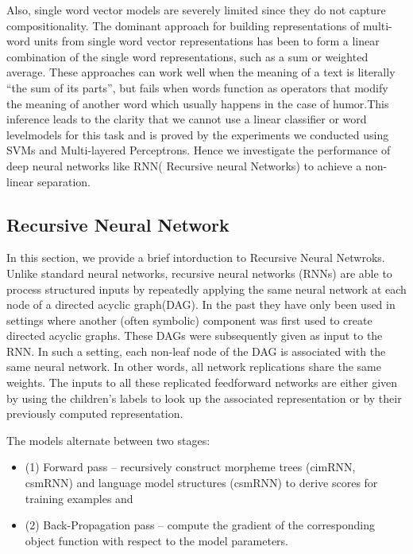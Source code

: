 \documentclass{acm_proc_article-sp}
\begin{document}
Also, single word vector models are severely limited since they do not capture compositionality. The dominant approach for building representations  of multi-word units from single word vector representations has been to form a linear combination of the single word representations, such as a sum or weighted average.  These approaches can work well when the meaning of a text is literally “the sum of its parts”, but fails when words function as operators that modify the meaning of another word which usually happens in the case of humor.This inference leads to the clarity that we cannot use a linear classifier or word  levelmodels for this task and is proved by the experiments we conducted using SVMs and Multi-layered Perceptrons. Hence we investigate the performance of deep neural networks like RNN( Recursive neural Networks) to achieve a non-linear separation.

\subsection{Recursive Neural Network}

In this section, we provide a brief intorduction to Recursive Neural Netwroks. Unlike standard neural networks, recursive neural networks (RNNs) are able to process structured inputs by repeatedly applying the same neural network at each node of a directed acyclic graph(DAG). In the past they have only been used in settings where another (often symbolic) component was first used to create directed acyclic graphs. These DAGs were subsequently given as input to the RNN. In such a setting, each non-leaf node of the DAG is associated with the same neural network. In other words, all network replications share the same weights. The inputs to all these replicated feedforward networks are either given by using the children’s labels to look up the associated representation or by their previously computed representation. 

The models alternate between two stages:

\begin{itemize} 

\item (1) Forward pass – recursively construct morpheme trees (cimRNN, csmRNN) and language model structures (csmRNN) to derive scores for training examples and 

\item (2) Back-Propagation pass – compute the gradient of the corresponding object function with respect to the model parameters.

\end{itemize}
\end{document}
